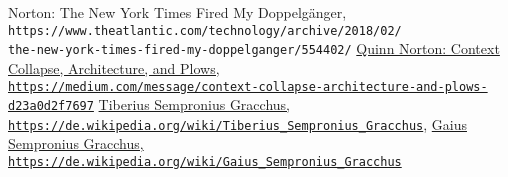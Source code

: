 \documentclass[a4,parindent=0pt]{article}
\begin{document}
\begin{thebibliography}{88}
{  Norton: The New York Times Fired My Doppelgänger,\\
\texttt{https://www.theatlantic.com/technology/archive/2018/02/\\the-new-york-times-fired-my-doppelganger/554402/}}
  \href{https://medium.com/message/context-collapse-architecture-and-plows-d23a0d2f7697}{Quinn Norton: Context Collapse, Architecture, and Plows,\\
\texttt{https://medium.com/message/context-collapse-architecture-and-plows-d23a0d2f7697}}
  \href{https://de.wikipedia.org/wiki/Tiberius_Sempronius_Gracchus}{Tiberius Sempronius Gracchus,\\
\texttt{https://de.wikipedia.org/wiki/Tiberius\_Sempronius\_Gracchus}}, \href{https://de.wikipedia.org/wiki/Gaius_Sempronius_Gracchus}{Gaius Sempronius Gracchus,\\
\texttt{https://de.wikipedia.org/wiki/Gaius\_Sempronius\_Gracchus}}

\end{thebibliography}
\end{document}
